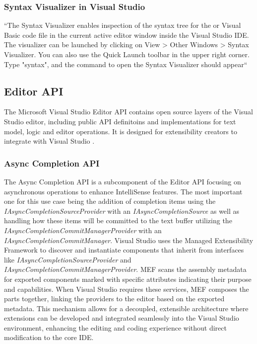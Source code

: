 \subsubsection{Syntax Visualizer in Visual Studio}
\label{ssec:SyntaxVisualizer}``The Syntax Visualizer enables inspection of the syntax tree for the \csharp or Visual Basic code file in the current active editor window inside the Visual Studio IDE. The visualizer can be launched by clicking on View > Other Windows > Syntax Visualizer. You can also use the Quick Launch toolbar in the upper right corner. Type "syntax", and the command to open the Syntax Visualizer should appear`` \citep{syntaxVisualizer}

\newpage
\subsection{Editor API}
\label{ssec:EditorAPIArchitecture}
The Microsoft Visual Studio Editor API contains open source layers of the Visual Studio editor, including public API definitoins and implementations for text model, logic and editor operations. It is designed for extensibility creators to integrate with Visual Studio \citep{vseditorapi}.

\subsubsection{Async Completion API}
\label{ssec:AsyncCompletionApi}
The Async Completion API is a subcomponent of the Editor API focusing on asynchronous operations to enhance IntelliSense features. The most important one for this use case being the addition of completion items using the \textit{IAsyncCompletionSourceProvider} with an \textit{IAsyncCompletionSource} as well as handling how these items will be committed to the text buffer utilizing the \textit{IAsyncCompletionCommitManagerProvider} with an \textit{IAsyncCompletionCommitManager}. Visual Studio uses the Managed Extensibility Framework to discover and instantiate components that inherit from interfaces like \textit{IAsyncCompletionSourceProvider} and \textit{IAsyncCompletionCommitManagerProvider}. MEF scans the assembly metadata for exported components marked with specific attributes indicating their purpose and capabilities. When Visual Studio requires these services, MEF composes the parts together, linking the providers to the editor based on the exported metadata. This mechanism allows for a decoupled, extensible architecture where extensions can be developed and integrated seamlessly into the Visual Studio environment, enhancing the editing and coding experience without direct modification to the core IDE. \citep{asynccompletionapi}

